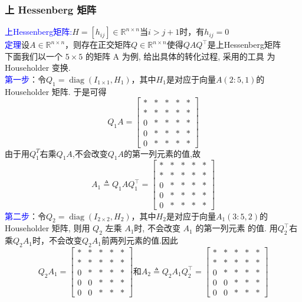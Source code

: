 \documentclass[12pt,a4paper]{article}
\begin{document}
\subsubsection{上 Hessenberg 矩阵}
\noindent \textcolor{blue}{上Hessenberg矩阵:}$H=\left[h_{i j}\right] \in \mathbb{R}^{n \times n}$当$i>j+1$时，有$h_{i j}=0$\\
\textcolor{blue}{定理}设$A \in \mathbb{R}^{n \times n}$，则存在正交矩阵$Q \in \mathbb{R}^{n \times n}$使得$Q A Q^{\top}$是上Hessenberg矩阵\\
下面我们以一个 $5\times 5$ 的矩阵 A 为例, 给出具体的转化过程, 采用的工具 为 Householder 变换.\\
\textcolor{blue}{第一步}：令$Q_{1}=\operatorname{diag}\left(I_{1 \times 1}, H_{1}\right)$，其中$H_{1}$是对应于向量$A(2 : 5,1)$的 Householder 矩阵. 于是可得
$$
Q_{1} A=\left[\begin{array}{ccccc}
* &*& *& *&* \\ 
* &*& *& *&* \\ 
0 &*& *& *&*\\ 
0 &*& *& *&*\\ 
0 &*& *& *&*
\end{array}\right]
$$
由于用$Q_{1}^{T}$右乘$Q_{1} A$,不会改变$Q_{1} A$的第一列元素的值,故
$$
A_{1} \triangleq Q_{1} A Q_{1}^{\top}=\left[\begin{array}{ccccc}
* &*& *& *&* \\ 
* &*& *& *&* \\ 
0 &*& *& *&*\\ 
0 &*& *& *&*\\ 
0 &*& *& *&*
\end{array}\right]
$$
\textcolor{blue}{第二步}：令$Q_{2}=\operatorname{diag}\left(I_{2 \times 2}, H_{2}\right)$，其中$H_{2}$是对应于向量$A_{1}(3 : 5,2)$的 Householder 矩阵, 则用 $Q_{2}$ 左乘 $A_{1} $时, 不会改变 $A_{1}$ 的第一列元素 的值. 用$Q_{2}^{\top}$右乘$Q_{2} A_{1}$时，不会改变$Q_{2} A_{1}$前两列元素的值.因此
$$
Q_{2} A_{1}=\left[\begin{array}{ccccc}
* &*& *& *&* \\ 
* &*& *& *&* \\ 
0 &*& *& *&*\\ 
0 &0& *& *&*\\ 
0 &0& *& *&*
\end{array}\right]和
A_{2}\triangleq Q_{2} A_{1} Q_{2}^{\top}=\left[\begin{array}{ccccc}
* &*& *& *&* \\ 
* &*& *& *&* \\ 
0 &*& *& *&*\\ 
0 &0& *& *&*\\ 
0 &0& *& *&*
\end{array}\right]
$$
\end{document}
